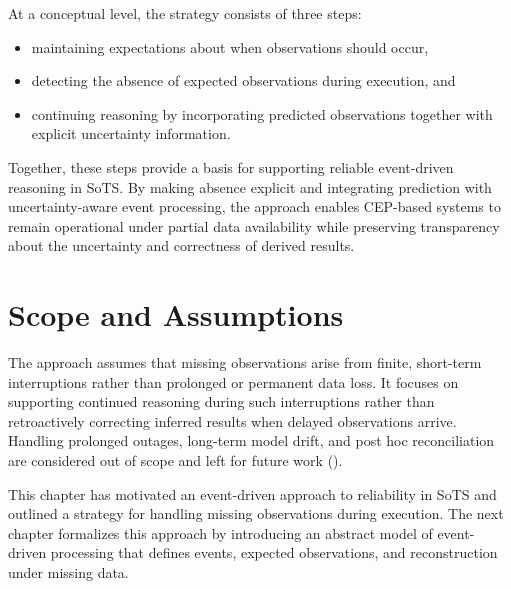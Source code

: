 At a conceptual level, the strategy consists of three steps:
\begin{itemize}
    \item maintaining expectations about when observations should occur,
    \item detecting the absence of expected observations during execution, and
    \item continuing reasoning by incorporating predicted observations together with explicit uncertainty information.
\end{itemize}

Together, these steps provide a basis for supporting reliable event-driven reasoning in SoTS. By making absence explicit and integrating prediction with uncertainty-aware event processing, the approach enables CEP-based systems to remain operational under partial data availability while preserving transparency about the uncertainty and correctness of derived results.


\section{Scope and Assumptions}
The approach assumes that missing observations arise from finite, short-term interruptions rather than prolonged or permanent data loss. It focuses on supporting continued reasoning during such interruptions rather than retroactively correcting inferred results when delayed observations arrive. Handling prolonged outages, long-term model drift, and post hoc reconciliation are considered out of scope and left for future work ().


\vspace{1em}
This chapter has motivated an event-driven approach to reliability in SoTS and outlined a strategy for handling missing observations during execution. The next chapter formalizes this approach by introducing an abstract model of event-driven processing that defines events, expected observations, and reconstruction under missing data.

